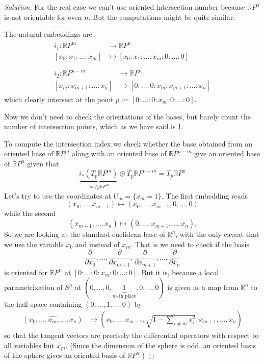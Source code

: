 \begin{proof}[Solution]
For the real case we can't use oriented intersection number because \(\mathbb{R}P^{n}\) is not orientable for even \(n\). But the computations might be quite similar:

The natural embeddings are
\begin{align*}
\begin{aligned}i_1: \mathbb{R}P^m &\longrightarrow \mathbb{R}P^n \\
	[x_0:x_1:\ldots:x_m] &\longmapsto [x_0:x_1:\ldots:x_m:0:\ldots:0]
\end{aligned}
\\\\\begin{aligned}	i_2: \mathbb{R}P^{n-m} &\longrightarrow \mathbb{R}P^n \\
[x_{m}:x_{m+1}:\ldots:x_n] &\longmapsto [0:\ldots:0:x_{m}:x_{m+1}:\ldots:x_n] \end{aligned}\end{align*}
which clearly intersect at the point \(p:=[0:\ldots:0:x_m:0:\ldots:0]\).

Now we don't need to check the orientations of the bases, but barely count the number of intersection points, which as we have said is 1.

\iffalse
To compute the intersection index we check whether the base obtained from an oriented base of \(\mathbb{R}P^{m}\) along with an oriented base of \(\mathbb{R}P^{n-m}\) give an oriented base of \(\mathbb{R}P^{n}\) given that
\[\underbrace{i_*(T_p \mathbb{R}P^{m})}_{=T_p\mathbb{R}P^m}\oplus T_p\mathbb{R}P^{n-m}=T_p\mathbb{R}P^{n}\]
Let's try to use the coordinates at \(U_m=\{x_m=1\}\). The first embedding reads
\[(x_0,\ldots,x_{m-1})\mapsto (x_0,\ldots,x_{m-1},0,\ldots,0)\]
while the second
\[(x_{m+1},\ldots,x_n)\mapsto (0,\ldots,x_{m+1},\ldots,x_n).\]
So we are looking at the standard euclidean base of \(\mathbb{R}^n\), with the only caveat that we use the variable \(x_0\) and instead of \(x_m\). That is we need to check if the basis
\[\frac{\partial }{\partial x_0},\ldots,\frac{\partial }{\partial x_{m-1}},\frac{\partial }{\partial x_{m+1}},\ldots,\frac{\partial }{\partial x_n}\]
is oriented for \(\mathbb{R}P^{n}\) at \([0:\ldots:0:x_m:0:\ldots:0]\). But it is, because a local parametrixation of \(S^{n}\) at \((0,\ldots,0,\underbrace{1}_{m\text{-th place} },0,\ldots,0)\) is given as a map from \(\mathbb{R}^n\) to the half-space containing \((0,\ldots,1,\ldots,0)\) by
\begin{align*}
	(x_0,\ldots,\widehat{x_m},\ldots,x_n) &\longmapsto \left(x_0,\ldots,x_{m-1},\sqrt{1-\sum_{i\neq m}x_i^2} ,x_{m+1},\ldots,x_n\right) 
\end{align*}
so that the tangent vectors are precisely the differential operators with respect to all variables but \(x_m\). (Since the dimension of the sphere is odd, an oriented basis of the sphere gives an oriented basis of  \(\mathbb{R}P^{n}\).)




\end{proof}
